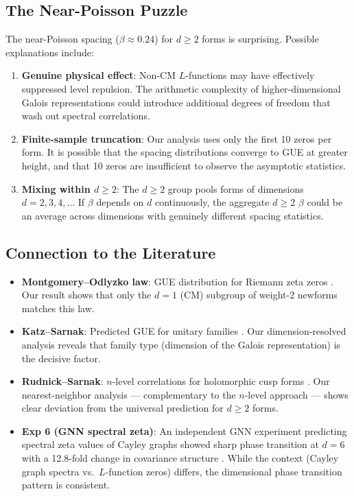 \documentclass[11pt]{article}
\begin{document}
\subsection{The Near-Poisson Puzzle}

The near-Poisson spacing ($\beta\approx0.24$) for $d\ge2$ forms is
surprising.  Possible explanations include:

\begin{enumerate}
  \item \textbf{Genuine physical effect}: Non-CM $L$-functions may have
    effectively suppressed level repulsion.  The arithmetic complexity
    of higher-dimensional Galois representations could introduce
    additional degrees of freedom that wash out spectral correlations.
  \item \textbf{Finite-sample truncation}: Our analysis uses only the
    first 10 zeros per form.  It is possible that the spacing
    distributions converge to GUE at greater height, and that 10 zeros
    are insufficient to observe the asymptotic statistics.
  \item \textbf{Mixing within $d\ge2$}: The $d\ge2$ group pools forms
    of dimensions $d=2,3,4,\ldots$  If $\beta$ depends on $d$
    continuously, the aggregate $d\ge2$ $\beta$ could be an average
    across dimensions with genuinely different spacing statistics.
\end{enumerate}

\subsection{Connection to the Literature}

\begin{itemize}
  \item \textbf{Montgomery--Odlyzko law}: GUE distribution for Riemann
    zeta zeros \cite{montgomery1973, odlyzko1987}.  Our result shows
    that only the $d=1$ (CM) subgroup of weight-2 newforms matches
    this law.
  \item \textbf{Katz--Sarnak}: Predicted GUE for unitary families
    \cite{katz1999}.  Our dimension-resolved analysis reveals that
    family type (dimension of the Galois representation) is the
    decisive factor.
  \item \textbf{Rudnick--Sarnak}: $n$-level correlations for
    holomorphic cusp forms \cite{rudnick1996}.  Our nearest-neighbor
    analysis --- complementary to the $n$-level approach --- shows
    clear deviation from the universal prediction for $d\ge2$ forms.
  \item \textbf{Exp 6 (GNN spectral zeta)}: An independent GNN
    experiment predicting spectral zeta values of Cayley graphs showed
    sharp phase transition at $d=6$ with a 12.8-fold change in
    covariance structure \cite{weiss2026companion}.  While the
    context (Cayley graph spectra vs.\ $L$-function zeros) differs,
    the dimensional phase transition pattern is consistent.
\end{itemize}
\end{document}
